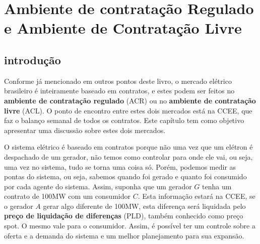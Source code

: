 \section{Ambiente de contratação Regulado e Ambiente de Contratação Livre}

\subsection{introdução}

Conforme já mencionado em outros pontos deste livro, o mercado elétrico brasileiro é inteiramente baseado em contratos, e estes podem ser feitos no \textbf{ambiente de contratação regulado} (ACR) ou no \textbf{ambiente de contratação livre} (ACL). O ponto de encontro entre estes dois mercados está na CCEE, que faz o balanço semanal de todos os contratos. Este capítulo tem como objetivo apresentar uma discussão sobre estes dois mercados. 

O sistema elétrico é baseado em contratos porque não uma vez que um elétron é despachado de um gerador, não temos como controlar para onde ele vai, ou seja, uma vez no sistema, tudo se torna uma coisa só. Porém, podemos medir as pontas do sistema, ou seja, sabemos quando foi gerado e quanto foi consumido por cada agente do sistema. Assim, suponha que um gerador $G$ tenha um contrato de 100MW com um consumidor $C$. Esta informação estará na CCEE, se o gerador $A$ gerar algo diferente de 100MW, esta diferença será liquidada pelo \textbf{preço de liquidação de diferenças} (PLD), também conhecido como preço spot. O mesmo vale para o consumidor. Assim, é possível ter um controle sobre a oferta e a demanda do sistema e um melhor planejamento para sua expansão. 

